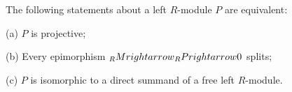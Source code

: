 The following statements about a left $R$-module $P$ are equivalent:

(a) $P$ is projective;

(b) Every epimorphism ${}_R M \\rightarrow {}_R P \\rightarrow 0$ splits;

(c) $P$ is isomorphic to a direct summand of a free left $R$-module.
